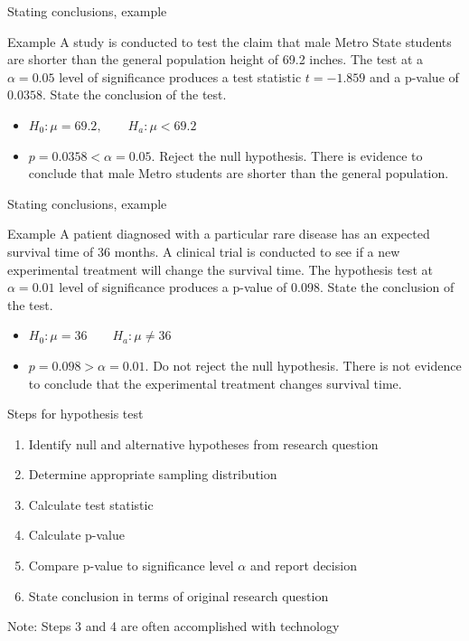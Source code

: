 \documentclass[xcolor=table, handout]{beamer}
\begin{document}
\begin{frame}{Stating conclusions, example}
\begin{exampleblock}{Example}
\large
A study is conducted to test the claim that male Metro State students are shorter than the general population height of 69.2 inches. The test at a $\alpha=0.05$ level of significance produces a test statistic $t=-1.859$ and a p-value of $0.0358$. State the conclusion of the test.
\begin{itemize}
\pause\item $H_0: \mu=69.2, \qquad H_a: \mu < 69.2$
\pause\item $p=0.0358 < \alpha = 0.05$. Reject the null hypothesis. There is evidence to conclude that male Metro students are shorter than the general population.
\end{itemize}
\end{exampleblock}
\end{frame}

\begin{frame}{Stating conclusions, example}
\begin{exampleblock}{Example}
\large
A patient diagnosed with a particular rare disease has an expected survival time of 36 months. A clinical trial is conducted to see if a new experimental treatment will change the survival time. The hypothesis test at $\alpha = 0.01$ level of significance produces a p-value of 0.098. State the conclusion of the test.
\begin{itemize}
\pause\item $H_0: \mu = 36 \qquad H_a: \mu \ne 36$
\pause\item $p=0.098 > \alpha = 0.01$. Do not reject the null hypothesis. There is not evidence to conclude that the experimental treatment changes survival time.
\end{itemize}\end{exampleblock}
\end{frame}

\begin{frame}{Steps for hypothesis test}
\begin{block}{}
\large
\begin{enumerate}
\item Identify null and alternative hypotheses from research question
\item Determine appropriate sampling distribution
\item Calculate test statistic
\item Calculate p-value
\item Compare p-value to significance level $\alpha$ and report decision
\item State conclusion in terms of original research question
\end{enumerate}
Note: Steps 3 and 4 are often accomplished with technology
\end{block}
\end{frame}
\end{document}
